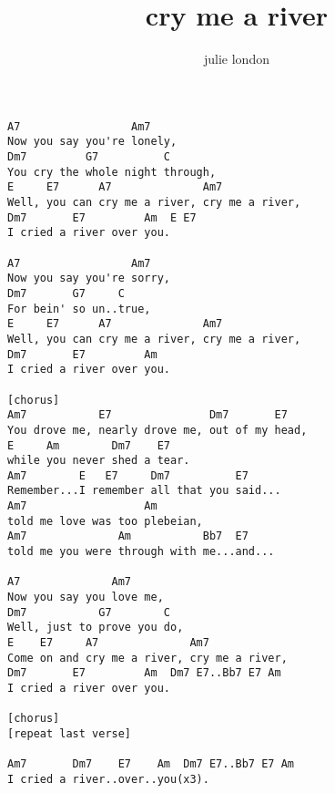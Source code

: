 \author{julie london}
\title{cry me a river}
\maketitle
\begin{verbatim}
A7                 Am7
Now you say you're lonely,
Dm7         G7          C
You cry the whole night through,
E     E7      A7              Am7
Well, you can cry me a river, cry me a river,
Dm7       E7         Am  E E7
I cried a river over you.

A7                 Am7
Now you say you're sorry,
Dm7       G7     C
For bein' so un..true,
E     E7      A7              Am7
Well, you can cry me a river, cry me a river,
Dm7       E7         Am
I cried a river over you.

[chorus]
Am7           E7               Dm7       E7
You drove me, nearly drove me, out of my head,
E     Am        Dm7    E7
while you never shed a tear.
Am7        E   E7     Dm7          E7
Remember...I remember all that you said...
Am7                  Am
told me love was too plebeian,
Am7              Am           Bb7  E7
told me you were through with me...and...

A7              Am7
Now you say you love me,
Dm7           G7        C
Well, just to prove you do,
E    E7     A7              Am7
Come on and cry me a river, cry me a river,
Dm7       E7         Am  Dm7 E7..Bb7 E7 Am
I cried a river over you.

[chorus]
[repeat last verse]

Am7       Dm7    E7    Am  Dm7 E7..Bb7 E7 Am
I cried a river..over..you(x3).
\end{verbatim}